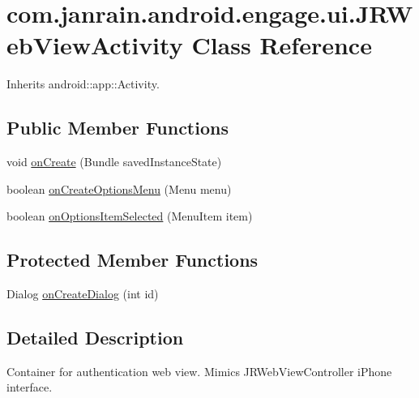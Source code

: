 \hypertarget{classcom_1_1janrain_1_1android_1_1engage_1_1ui_1_1_j_r_web_view_activity}{
\section{com.janrain.android.engage.ui.JRWebViewActivity Class Reference}
\label{classcom_1_1janrain_1_1android_1_1engage_1_1ui_1_1_j_r_web_view_activity}
}


Inherits android::app::Activity.

\subsection*{Public Member Functions}
\begin{DoxyCompactItemize}
\item 
void \hyperlink{classcom_1_1janrain_1_1android_1_1engage_1_1ui_1_1_j_r_web_view_activity_a4213460f16f155562638d053a09e7da4}{onCreate} (Bundle savedInstanceState)
\item 
boolean \hyperlink{classcom_1_1janrain_1_1android_1_1engage_1_1ui_1_1_j_r_web_view_activity_ab8da712adb3976bddff637c2e950e5da}{onCreateOptionsMenu} (Menu menu)
\item 
boolean \hyperlink{classcom_1_1janrain_1_1android_1_1engage_1_1ui_1_1_j_r_web_view_activity_ad98cc7279af6dd09581f5bd3ae645991}{onOptionsItemSelected} (MenuItem item)
\end{DoxyCompactItemize}
\subsection*{Protected Member Functions}
\begin{DoxyCompactItemize}
\item 
Dialog \hyperlink{classcom_1_1janrain_1_1android_1_1engage_1_1ui_1_1_j_r_web_view_activity_ac3902fbf130d74a4b223c104e7509753}{onCreateDialog} (int id)
\end{DoxyCompactItemize}


\subsection{Detailed Description}
Container for authentication web view. Mimics JRWebViewController iPhone interface. 

